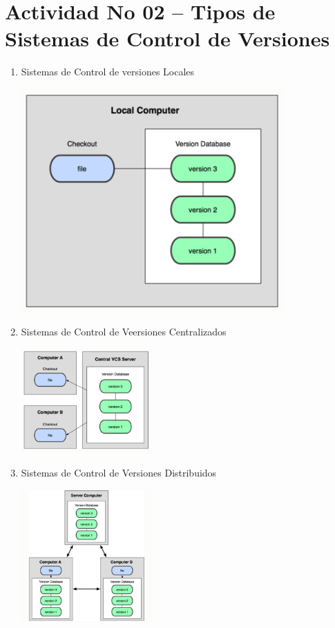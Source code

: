 \section{Actividad No 02 – Tipos de Sistemas de Control de Versiones} 

\begin{enumerate}[1.]
	\item Sistemas de Control de versiones Locales
	\\

	\begin{center}
	\includegraphics[width=10cm]{./Imagenes/local} 
	\end{center}

	\item Sistemas de Control de Veersiones Centralizados
	\\
	
	\begin{center}
	\includegraphics[width=5cm]{./Imagenes/centralizados} 
	\end{center}

	\item Sistemas de Control de Versiones Distribuidos
	\\

	\begin{center}
	\includegraphics[width=5cm]{./Imagenes/distribuidos} 
	\end{center}

\end{enumerate}


